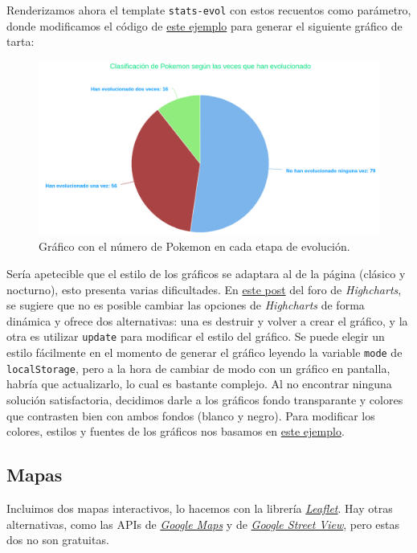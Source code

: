 \documentclass{article}
\begin{document}
Renderizamos ahora el template \texttt{stats-evol} con estos recuentos
como parámetro, donde modificamos el código de \href{}{este ejemplo}
para generar el siguiente gráfico de tarta:

\begin{figure}[H]
  \centering
  \includegraphics[width=190mm]{imgs/stats-evol}
  \caption{Gráfico con el número de Pokemon en cada etapa de evolución.}
  \label{fig:stats-evol}
\end{figure}

Sería apetecible que el estilo de los gráficos se adaptara al de la
página (clásico y nocturno), esto presenta varias dificultades. En
\href{https://www.highcharts.com/forum/viewtopic.php?t=44170}{este
  post} del foro de \textit{Highcharts}, se sugiere que no es posible
cambiar las opciones de \textit{Highcharts} de forma dinámica y ofrece
dos alternativas: una es destruir y volver a crear el gráfico, y la
otra es utilizar \texttt{update} para modificar el estilo del
gráfico. Se puede elegir un estilo fácilmente en el momento de generar
el gráfico leyendo la variable \texttt{mode} de \texttt{localStorage},
pero a la hora de cambiar de modo con un gráfico en pantalla, habría
que actualizarlo, lo cual es bastante complejo. Al no encontrar
ninguna solución satisfactoria, decidimos darle a los gráficos fondo
transparante y colores que contrasten bien con ambos fondos (blanco y
negro). Para modificar los colores, estilos y fuentes de los gráficos
nos basamos en
\href{https://stackoverflow.com/questions/8607365/how-to-change-the-text-color-in-highcharts}{este
  ejemplo}.

\subsection{Mapas}

Incluimos dos mapas interactivos, lo hacemos con la librería
\href{https://leafletjs.com/}{\textit{Leaflet}}. Hay otras
alternativas, como las APIs de
\href{https://developers.google.com/maps/documentation/javascript/overview?hl=es}{\textit{Google
    Maps}} y de
\href{https://developers.google.com/maps/documentation/streetview/overview?hl=es}{\textit{Google
    Street View}}, pero estas dos no son gratuitas.
\end{document}
